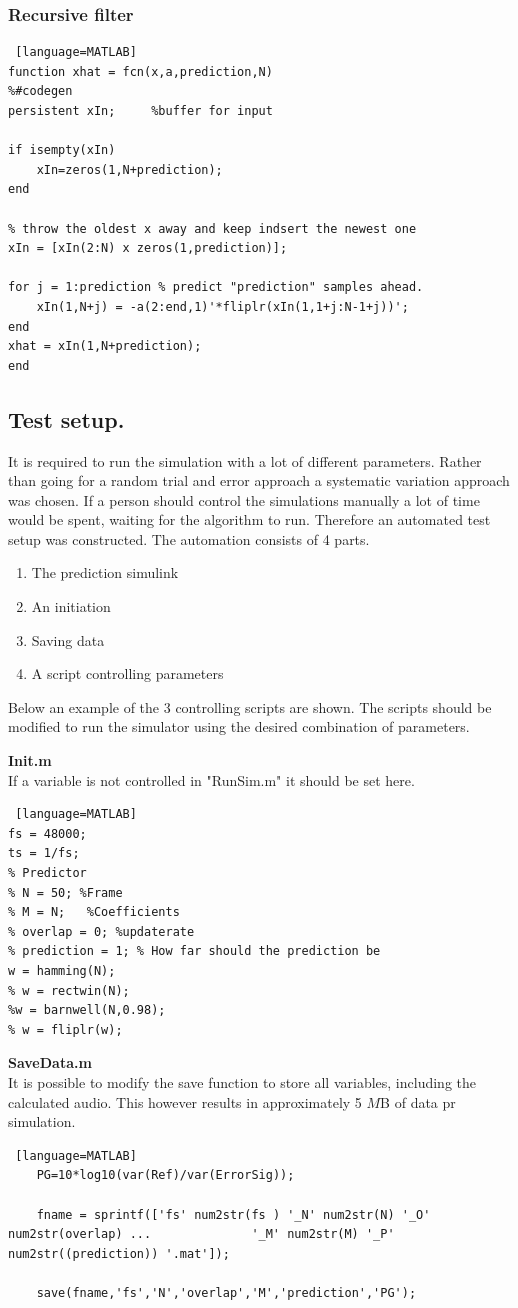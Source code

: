 \subsubsection{Recursive filter}
\begin{lstlisting} [language=MATLAB]
function xhat = fcn(x,a,prediction,N)
%#codegen
persistent xIn;     %buffer for input

if isempty(xIn)
	xIn=zeros(1,N+prediction);
end

% throw the oldest x away and keep indsert the newest one
xIn = [xIn(2:N) x zeros(1,prediction)]; 

for j = 1:prediction % predict "prediction" samples ahead. 
	xIn(1,N+j) = -a(2:end,1)'*fliplr(xIn(1,1+j:N-1+j))';
end
xhat = xIn(1,N+prediction);
end
\end{lstlisting}

\subsection{Test setup.}
It is required to run the simulation with a lot of different parameters. Rather than going for a random trial and error approach a systematic variation approach was chosen. If a person should control the simulations manually a lot of time would be spent, waiting for the algorithm to run. Therefore an automated test setup was constructed. The automation consists of 4 parts. 
\begin{enumerate}
	\item The prediction simulink
	\item An initiation 
	\item Saving data
	\item A script controlling parameters 
\end{enumerate}  

Below an example of the 3 controlling scripts are shown. The  scripts should be modified to run the simulator using the desired combination of parameters.

\textbf{Init.m}\\
If a variable is not controlled in "RunSim.m" it should be set here. 
\begin{lstlisting} [language=MATLAB]
fs = 48000;
ts = 1/fs; 
% Predictor 
% N = 50; %Frame
% M = N;   %Coefficients
% overlap = 0; %updaterate
% prediction = 1; % How far should the prediction be
w = hamming(N); 
% w = rectwin(N);
%w = barnwell(N,0.98);
% w = fliplr(w);
\end{lstlisting}

\textbf{SaveData.m}\\
It is possible to modify the save function to store all variables, including the calculated audio. This however results in approximately 5 $M$B of data pr simulation.  
\begin{lstlisting} [language=MATLAB]
	PG=10*log10(var(Ref)/var(ErrorSig));
	
	fname = sprintf(['fs' num2str(fs ) '_N' num2str(N) '_O' num2str(overlap) ...              '_M' num2str(M) '_P' num2str((prediction)) '.mat']);
	
	save(fname,'fs','N','overlap','M','prediction','PG');
\end{lstlisting}

